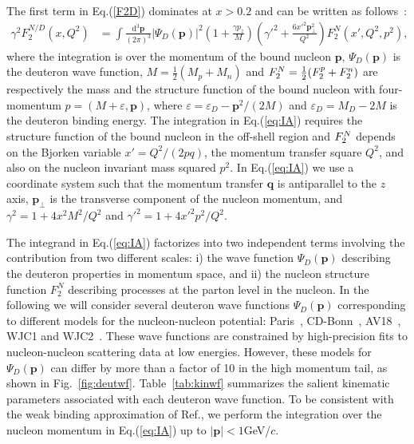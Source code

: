 \documentclass[%
      aps,
      prd,
      floatfix,
      preprintnumbers,
      preprint,
      showpacs,
      nofootinbib,
      tightenlines,
      amssymb,
      amsmath
]{revtex4-1}
\newcommand{\ud}     {\mathrm{d}}
\newcommand{\ceps}{\varepsilon}
\newcommand{\eq}[1]{Eq.(\ref{#1})}
\begin{document}
The first term in \eq{F2D} dominates at $x>0.2$ and can be written as follows~\cite{KP04}: 
%
\begin{align}
\label{eq:IA}
\gamma^2 F_2^{N/D}(x,Q^2) &=
 \int \frac{\ud^3\bm p}{(2\pi)^3} 
    \left|\Psi_D(\bm p)\right|^2
     \left(1+\frac{\gamma p_z}{M}\right)
\left({\gamma'}^2 +\frac{6{x'}^2 \bm{p}_\perp^2}{Q^2} \right)
F_2^N(x',Q^2,p^2),
\end{align}
% 
where the integration is over the momentum of the bound nucleon $\bm p$, $\Psi_D(\bm p)$ is the deuteron wave function,
$M=\tfrac12(M_p+M_n)$ and $F_2^{\smash{N}}=\tfrac12(F_2^p+F_2^n)$ are respectively the mass and
the structure function of the bound nucleon with four-momentum $p=(M+\ceps,\bm{p})$,
where $\ceps=\ceps_D-\bm p^2/(2M)$ and $\ceps_D=M_D-2M$ is the deuteron binding energy.
The integration in \eq{eq:IA} requires the structure function of the bound nucleon
in the off-shell region and  $F_2^{\smash{N}}$ depends on the Bjorken variable $x'=Q^2/(2p q)$, 
the momentum transfer square $Q^2$,  
and also on the nucleon invariant mass squared $p^2$. 
In \eq{eq:IA} we use a coordinate system such that the momentum transfer $\bm{q}$
is antiparallel to the $z$ axis, $\bm{p}_\perp$ is the transverse component of the nucleon momentum,
and $\gamma^2=1+4x^2 M^2/Q^2$ and ${\gamma'}^2=1+4{x'}^2 p^2/Q^2$.

The integrand in \eq{eq:IA} factorizes into two independent terms involving the contribution
from two different scales: 
i) the wave function $\Psi_D(\bm p)$ describing the deuteron properties in momentum space, and  
ii) the nucleon structure function $F_2^N$ describing processes at the parton level in the nucleon.
% 
In the following we will consider several deuteron wave functions $\Psi_D(\bm p)$ 
corresponding to different models for the nucleon-nucleon potential: 
Paris~\cite{Lacombe:1980dr}, CD-Bonn~\cite{Machleidt:2000ge}, AV18~\cite{Veerasamy:2011ak}, 
WJC1 and WJC2~\cite{Gross:2008ps,Gross:2010qm}. 
These wave functions are constrained by high-precision fits to 
nucleon-nucleon scattering data at low energies. 
% 
However, these models for $\Psi_D(\bm p)$ can differ by more
than a factor of 10 in the high momentum tail, as shown in Fig.~\ref{fig:deutwf}. 
Table~\ref{tab:kinwf} summarizes the salient kinematic parameters 
associated with each deuteron wave function.
To be consistent with the weak binding approximation of Ref.\cite{KP04}, 
we perform the integration over the nucleon momentum in \eq{eq:IA} up to $|\bm p|<1$\:GeV/$c$.   
\end{document}

